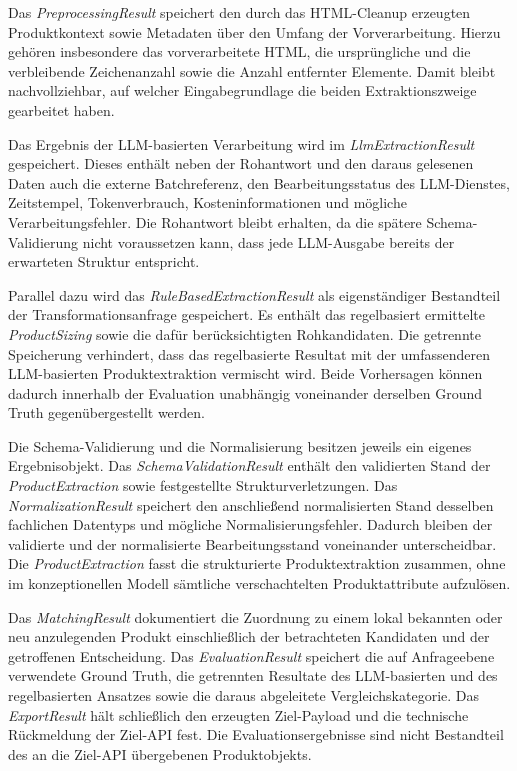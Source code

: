 Das \textit{PreprocessingResult} speichert den durch das HTML-Cleanup erzeugten Produktkontext sowie Metadaten über den Umfang der Vorverarbeitung. Hierzu gehören insbesondere 
das vorverarbeitete HTML, die ursprüngliche und die verbleibende Zeichenanzahl sowie die Anzahl entfernter Elemente. Damit bleibt nachvollziehbar, auf welcher Eingabegrundlage 
die beiden Extraktionszweige gearbeitet haben.

Das Ergebnis der LLM-basierten Verarbeitung wird im \textit{LlmExtractionResult} gespeichert. Dieses enthält neben der Rohantwort und den daraus gelesenen Daten auch die 
externe Batchreferenz, den Bearbeitungsstatus des LLM-Dienstes, Zeitstempel, Tokenverbrauch, Kosteninformationen und mögliche Verarbeitungsfehler. Die Rohantwort bleibt 
erhalten, da die spätere Schema-Validierung nicht voraussetzen kann, dass jede LLM-Ausgabe bereits der erwarteten Struktur entspricht.

Parallel dazu wird das \textit{RuleBasedExtractionResult} als eigenständiger Bestandteil der Transformationsanfrage gespeichert. Es enthält das regelbasiert ermittelte 
\textit{ProductSizing} sowie die dafür berücksichtigten Rohkandidaten. Die getrennte Speicherung verhindert, dass das regelbasierte Resultat mit der umfassenderen 
LLM-basierten Produktextraktion vermischt wird. Beide Vorhersagen können dadurch innerhalb der Evaluation unabhängig voneinander derselben Ground Truth gegenübergestellt 
werden.

Die Schema-Validierung und die Normalisierung besitzen jeweils ein eigenes Ergebnisobjekt. Das \textit{SchemaValidationResult} enthält den validierten Stand der 
\textit{ProductExtraction} sowie festgestellte Strukturverletzungen. Das \textit{NormalizationResult} speichert den anschließend normalisierten Stand desselben fachlichen 
Datentyps und mögliche Normalisierungsfehler. Dadurch bleiben der validierte und der normalisierte Bearbeitungsstand voneinander unterscheidbar. Die \textit{ProductExtraction} 
fasst die strukturierte Produktextraktion zusammen, ohne im konzeptionellen Modell sämtliche verschachtelten Produktattribute aufzulösen.

Das \textit{MatchingResult} dokumentiert die Zuordnung zu einem lokal bekannten oder neu anzulegenden Produkt einschließlich der betrachteten Kandidaten und der getroffenen 
Entscheidung. Das \textit{EvaluationResult} speichert die auf Anfrageebene verwendete Ground Truth, die getrennten Resultate des LLM-basierten und des regelbasierten 
Ansatzes sowie die daraus abgeleitete Vergleichskategorie. Das \textit{ExportResult} hält schließlich den erzeugten Ziel-Payload und die technische Rückmeldung der Ziel-API 
fest. Die Evaluationsergebnisse sind nicht Bestandteil des an die Ziel-API übergebenen Produktobjekts.

